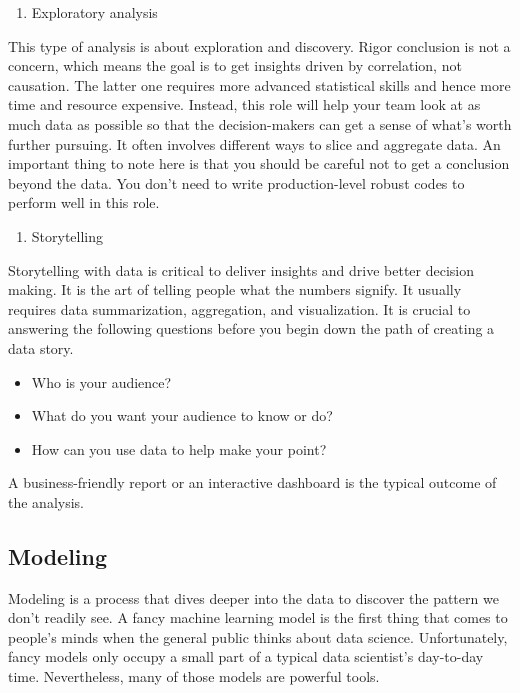 \documentclass[12pt,]{krantz}
\providecommand{\tightlist}{%
  \setlength{\itemsep}{0pt}\setlength{\parskip}{0pt}}
\begin{document}
\begin{enumerate}
\def\labelenumi{(\arabic{enumi})}
\setcounter{enumi}{1}
\tightlist
\item
  Exploratory analysis
\end{enumerate}

This type of analysis is about exploration and discovery. Rigor conclusion is not a concern, which means the goal is to get insights driven by correlation, not causation. The latter one requires more advanced statistical skills and hence more time and resource expensive. Instead, this role will help your team look at as much data as possible so that the decision-makers can get a sense of what's worth further pursuing. It often involves different ways to slice and aggregate data. An important thing to note here is that you should be careful not to get a conclusion beyond the data. You don't need to write production-level robust codes to perform well in this role.

\begin{enumerate}
\def\labelenumi{(\arabic{enumi})}
\setcounter{enumi}{2}
\tightlist
\item
  Storytelling
\end{enumerate}

Storytelling with data is critical to deliver insights and drive better decision making. It is the art of telling people what the numbers signify. It usually requires data summarization, aggregation, and visualization. It is crucial to answering the following questions before you begin down the path of creating a data story.

\begin{itemize}
\tightlist
\item
  Who is your audience?
\item
  What do you want your audience to know or do?
\item
  How can you use data to help make your point?
\end{itemize}

A business-friendly report or an interactive dashboard is the typical outcome of the analysis.

\hypertarget{modeling}{%
\subsection{Modeling}\label{modeling}}

Modeling is a process that dives deeper into the data to discover the pattern we don't readily see. A fancy machine learning model is the first thing that comes to people's minds when the general public thinks about data science. Unfortunately, fancy models only occupy a small part of a typical data scientist's day-to-day time. Nevertheless, many of those models are powerful tools.
\end{document}
